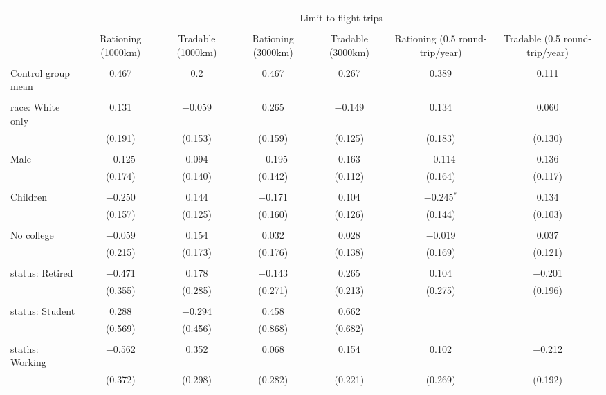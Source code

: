 
\begin{tabular}{@{\extracolsep{5pt}}lcccccc} 
\\[-1.8ex]\hline 
\hline \\[-1.8ex] 
 & \multicolumn{6}{c}{Limit to flight trips} \\ 
\cline{2-7} 
\\[-1.8ex] & Rationing (1000km) & Tradable (1000km) & Rationing (3000km) & Tradable (3000km) & Rationing (0.5 round-trip/year) & Tradable (0.5 round-trip/year) \\ 
\hline \\[-1.8ex] 
 Control group mean & 0.467 & 0.2 & 0.467 & 0.267 & 0.389 & 0.111  \\ \hline \\[-1.8ex] race: White only & 0.131 & $-$0.059 & 0.265 & $-$0.149 & 0.134 & 0.060 \\ 
  & (0.191) & (0.153) & (0.159) & (0.125) & (0.183) & (0.130) \\ 
  & & & & & & \\ 
 Male & $-$0.125 & 0.094 & $-$0.195 & 0.163 & $-$0.114 & 0.136 \\ 
  & (0.174) & (0.140) & (0.142) & (0.112) & (0.164) & (0.117) \\ 
  & & & & & & \\ 
 Children & $-$0.250 & 0.144 & $-$0.171 & 0.104 & $-$0.245$^{*}$ & 0.134 \\ 
  & (0.157) & (0.125) & (0.160) & (0.126) & (0.144) & (0.103) \\ 
  & & & & & & \\ 
 No college & $-$0.059 & 0.154 & 0.032 & 0.028 & $-$0.019 & 0.037 \\ 
  & (0.215) & (0.173) & (0.176) & (0.138) & (0.169) & (0.121) \\ 
  & & & & & & \\ 
 status: Retired & $-$0.471 & 0.178 & $-$0.143 & 0.265 & 0.104 & $-$0.201 \\ 
  & (0.355) & (0.285) & (0.271) & (0.213) & (0.275) & (0.196) \\ 
  & & & & & & \\ 
 status: Student & 0.288 & $-$0.294 & 0.458 & 0.662 &  &  \\ 
  & (0.569) & (0.456) & (0.868) & (0.682) &  &  \\ 
  & & & & & & \\ 
 staths: Working & $-$0.562 & 0.352 & 0.068 & 0.154 & 0.102 & $-$0.212 \\ 
  & (0.372) & (0.298) & (0.282) & (0.221) & (0.269) & (0.192) \\ 

\end{tabular}
